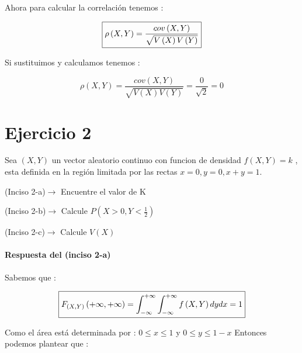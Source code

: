 \documentclass[12pt]{article}
\begin{document}
    \begin{flushleft}
        Ahora para calcular la correlaci\'on tenemos : 
    \end{flushleft}

    \begin{equation*}
        \fbox{$
            \rho \left(X,Y\right) = \displaystyle \frac{cov \left(X,Y\right)}{\sqrt{V\left(X\right)V\left(Y\right)}}
        $}    
    \end{equation*}

    \begin{flushleft}
        Si sustituimos y calculamos tenemos : 
    \end{flushleft}

    \begin{equation*}
        \rho \left(X,Y\right) = \displaystyle \frac{cov \left(X,Y\right)}{\sqrt{V\left(X\right)V\left(Y\right)}} = \frac{0}{\sqrt{2}} = 0 
    \end{equation*}


    \section*{Ejercicio 2 } 

    \begin{flushleft}
        Sea $\left(X,Y\right) $ un vector aleatorio continuo con funcion de densidad $ f\left(X,Y\right) = k $ , esta definida en la regi\'on limitada por las rectas $ x = 0 , y = 0 , x + y = 1 $.
    \end{flushleft}
    
    (Inciso 2-a)$ \to$ Encuentre el valor de K
     
    (Inciso 2-b)$ \to $ Calcule $  P\left(X>0,Y<\frac{1}{2}\right) $
    
    (Inciso 2-c)$ \to $ Calcule $ V(X) $
    \paragraph{Respuesta del (inciso 2-a)}  Sabemos que : 
    
    \begin{equation*}
        \fbox{$
            \displaystyle F_{\left(X,Y\right)} \left(+\infty,+\infty\right)  = \displaystyle \int_{-\infty}^{+\infty}\int_{-\infty}^{+\infty}f\left(X,Y\right)dy dx = 1
        $} 
    \end{equation*}

    \begin{flushleft}
        Como el \'area est\'a determinada por : $ 0\leq x \leq1  $ y $   0\leq y \leq1-x $ 
        Entonces podemos plantear que : 
    \end{flushleft}
         
\end{document}
